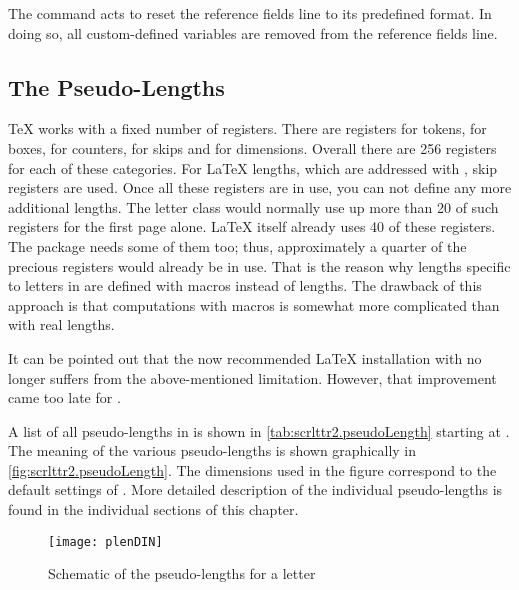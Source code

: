 The command  acts to reset the reference
fields line to its predefined format. In doing so, all custom-defined
variables are removed from the reference fields line.
%
%
%
%
%


\subsection{The Pseudo-Lengths}
\label{sec:scrlttr2.pseudoLength}

\begin{Explain}
  {\TeX} works with a fixed number of registers. There are registers
  for tokens, for boxes, for counters, for skips and for dimensions.
  Overall there are 256 registers for each of these categories. For
  {\LaTeX} lengths, which are addressed with , skip
  registers are used. Once all these registers are in use, you can not
  define any more additional lengths.  The letter class
   would normally use up more than 20 of such
  registers for the first page alone. {\LaTeX} itself already uses 40
  of these registers. The  package needs some of
  them too; thus, approximately a quarter of the precious registers
  would already be in use. That is the reason why lengths specific to
  letters in  are defined with macros instead of
  lengths. The drawback of this approach is that computations with
  macros is somewhat more complicated than with real lengths.

  It can be pointed out that the now recommended {\LaTeX} installation
  with {\eTeX} no longer suffers from the above-mentioned
  limitation. However, that improvement came too late for
  .
\end{Explain}

A list of all pseudo-lengths in  is shown in
\autoref{tab:scrlttr2.pseudoLength} starting at
. The meaning of the various
pseudo-lengths is shown graphically in
\autoref{fig:scrlttr2.pseudoLength}. The dimensions used in the figure
correspond to the default settings of . More detailed
description of the individual pseudo-lengths is found in the
individual sections of this chapter.

\begin{figure}
  \centering
  \texttt{[image: plenDIN]}
  \caption{Schematic of the pseudo-lengths for a letter}
  \label{fig:scrlttr2.pseudoLength}
\end{figure}

